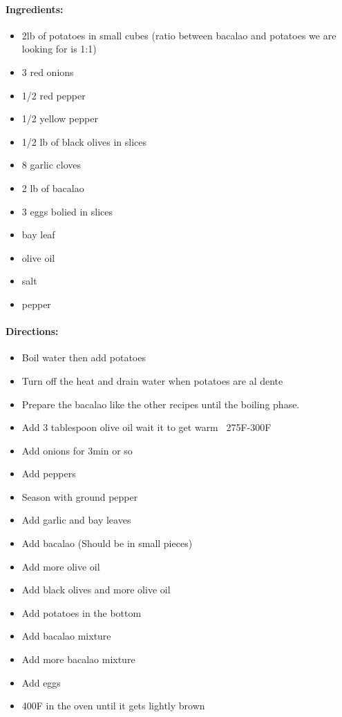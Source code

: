 \documentclass{article}
\begin{document}
\paragraph{Ingredients:}
\begin{itemize}
    \item 2lb of potatoes in small cubes (ratio between bacalao and potatoes we are looking for is 1:1)
    \item 3 red onions
    \item 1/2 red pepper
    \item 1/2 yellow pepper
    \item 1/2 lb of black olives in slices
    \item 8 garlic cloves
    \item 2 lb of bacalao
    \item 3 eggs bolied in slices
    \item bay leaf
    \item olive oil
    \item salt
    \item pepper
\end{itemize}

\paragraph{Directions:}
\begin{itemize}
    \item Boil water then add potatoes
    \item Turn off the heat and drain water when potatoes are al dente
    \item Prepare the bacalao like the other recipes until the boiling phase.
    \item Add 3 tablespoon olive oil wait it to get warm ~275F-300F
    \item Add onions for 3min or so
    \item Add peppers
    \item Season with ground pepper
    \item Add garlic and bay leaves
    \item Add bacalao (Should be in small pieces)
    \item Add more olive oil
    \item Add black olives and more olive oil
    \item Add potatoes in the bottom
    \item Add bacalao mixture
    \item Add more bacalao mixture
    \item Add eggs
    \item 400F in the oven until it gets lightly brown
\end{itemize}
\end{document}
